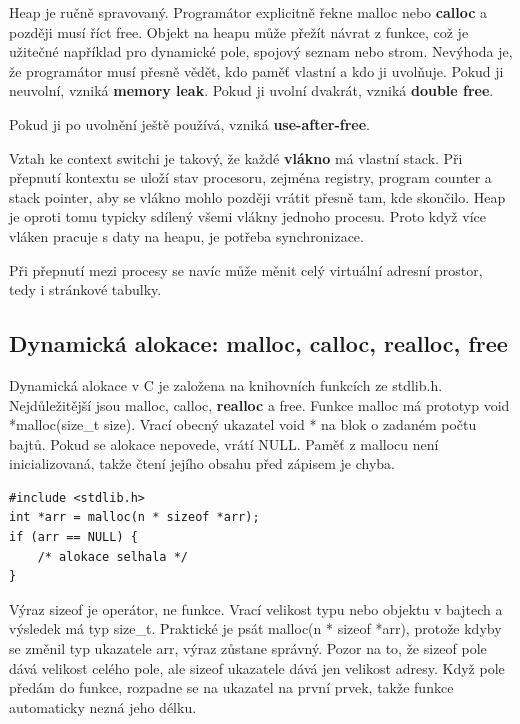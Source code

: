 \documentclass[11pt,a4paper]{article}
\begin{document}
Heap je ručně spravovaný. Programátor explicitně řekne malloc nebo \textbf{calloc} a později musí říct free. Objekt na heapu může přežít návrat z funkce, což je užitečné například pro dynamické pole, spojový seznam nebo strom. Nevýhoda je, že programátor musí přesně vědět, kdo paměť vlastní a kdo ji uvolňuje. Pokud ji neuvolní, vzniká \textbf{memory leak}. Pokud ji uvolní dvakrát, vzniká \textbf{double free}.

Pokud ji po uvolnění ještě používá, vzniká \textbf{use-after-free}.

Vztah ke context switchi je takový, že každé \textbf{vlákno} má vlastní stack. Při přepnutí kontextu se uloží stav procesoru, zejména registry, program counter a stack pointer, aby se vlákno mohlo později vrátit přesně tam, kde skončilo. Heap je oproti tomu typicky sdílený všemi vlákny jednoho procesu. Proto když více vláken pracuje s daty na heapu, je potřeba synchronizace.

Při přepnutí mezi procesy se navíc může měnit celý virtuální adresní prostor, tedy i stránkové tabulky.

\subsection*{Dynamická alokace: malloc, calloc, realloc, free}

Dynamická alokace v C je založena na knihovních funkcích ze stdlib.h. Nejdůležitější jsou malloc, calloc, \textbf{realloc} a free. Funkce malloc má prototyp void *malloc(size\_t size). Vrací obecný ukazatel void * na blok o zadaném počtu bajtů. Pokud se alokace nepovede, vrátí NULL. Paměť z mallocu není inicializovaná, takže čtení jejího obsahu před zápisem je chyba.

\begin{codebox}
\small
\begin{verbatim}
#include <stdlib.h>
int *arr = malloc(n * sizeof *arr);
if (arr == NULL) {
    /* alokace selhala */
}
\end{verbatim}
\end{codebox}

Výraz sizeof je operátor, ne funkce. Vrací velikost typu nebo objektu v bajtech a výsledek má typ size\_t. Praktické je psát malloc(n * sizeof *arr), protože kdyby se změnil typ ukazatele arr, výraz zůstane správný. Pozor na to, že sizeof pole dává velikost celého pole, ale sizeof ukazatele dává jen velikost adresy. Když pole předám do funkce, rozpadne se na ukazatel na první prvek, takže funkce automaticky nezná jeho délku.
\end{document}
